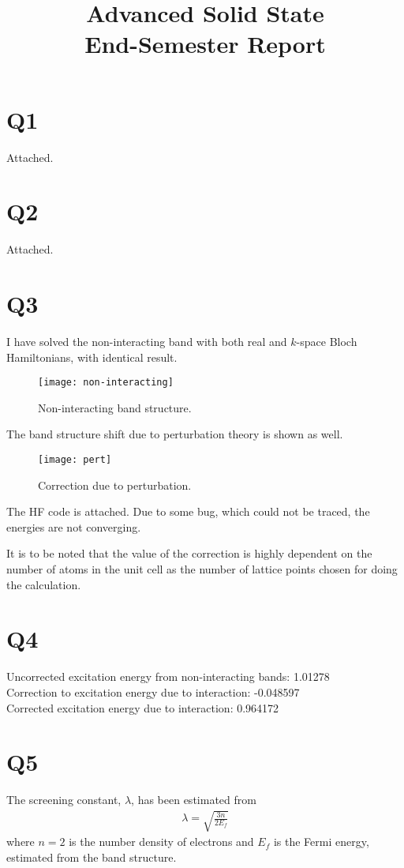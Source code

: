\documentclass[]{report}
\title{Advanced Solid State\\
End-Semester Report}
\author{}
\begin{document}
\maketitle

\section{Q1}
Attached.

\section{Q2}
Attached.

\section{Q3}
I have solved the non-interacting band with both real and $k$-space Bloch Hamiltonians, with identical result.
\begin{figure}[h!]
	\centering
	\texttt{[image: non-interacting]}
	\caption{Non-interacting band structure.}
	\label{fig:non-interacting}
\end{figure}

The band structure shift due to perturbation theory is shown as well.

\begin{figure}[h!]
	\centering
	\texttt{[image: pert]}
	\caption{Correction due to perturbation.}
	\label{fig:pert}
\end{figure}

The HF code is attached. Due to some bug, which could not be traced, the energies are not converging.

It is to be noted that the value of the correction is highly dependent on the number of atoms in the unit cell as the number of lattice points chosen for doing the calculation.

\section{Q4}
Uncorrected excitation energy from non-interacting bands: 1.01278\\
Correction to excitation energy due to interaction: -0.048597\\
Corrected excitation energy due to interaction: 0.964172

\section{Q5}
The screening constant, $\lambda$, has been estimated from
\begin{align}
\lambda = \sqrt{\frac{3n}{2 E_f}}
\end{align}
where $n=2$ is the number density of electrons and $E_f$ is the Fermi energy, estimated from the band structure.
\end{document}
